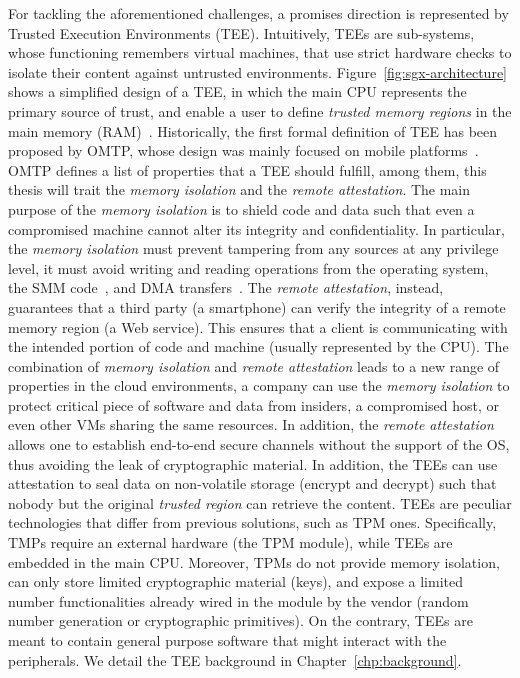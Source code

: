 For tackling the aforementioned challenges, a promises direction is 
represented by Trusted Execution Environments (TEE).
Intuitively, TEEs are sub-systems, whose functioning remembers virtual 
machines, that use strict hardware checks to isolate their content against 
untrusted environments.
Figure~\ref{fig:sgx-architecture} shows a simplified design of a TEE, in which 
the main CPU represents the primary source of 
trust, and enable a user to define \emph{trusted memory regions} in the main 
memory (RAM)~\citep{Sabt2015TrustedEE}.
Historically, the first formal definition of TEE has been proposed by OMTP, 
whose design was mainly focused on mobile platforms~\citep{omtp}.
OMTP defines a list of properties that a TEE should fulfill, among them, this 
thesis will trait the \emph{memory isolation} and the \emph{remote attestation}.
The main purpose of the \emph{memory isolation} is to shield code and data such 
that even a compromised machine cannot alter its integrity and confidentiality.
In particular, the \emph{memory isolation} must prevent tampering from any 
sources at any privilege level, \eg it must avoid writing and reading 
operations from the operating system, the SMM code~\citep{yao2009system}, and 
DMA transfers~\citep{coke1998implementing}.
The \emph{remote attestation}, instead, guarantees that a third party (\eg a 
smartphone) can verify the integrity of a remote memory region (\eg a 
Web service).
This ensures that a client is communicating with the intended portion of code 
and machine (usually represented by the CPU).
The combination of \emph{memory isolation} and \emph{remote attestation} leads 
to a new range of properties in the cloud environments, \ie a company 
can use the \emph{memory isolation} to protect critical piece of 
software and data from insiders, a compromised host, or even other VMs sharing 
the same resources.
In addition, the \emph{remote attestation} allows one to establish 
end-to-end secure channels without the support of the OS, thus avoiding the 
leak of cryptographic material.
In addition, the TEEs can use attestation to seal data on non-volatile storage 
(\ie encrypt and decrypt) such that nobody but the original \emph{trusted 
region} can retrieve the content. 
TEEs are peculiar technologies that differ from previous solutions, such as TPM 
ones. Specifically, TMPs require an external hardware (\ie the TPM module), 
while TEEs are embedded in the main CPU.
Moreover, TPMs do not provide memory isolation, can only store limited 
cryptographic material (\eg keys), and expose a limited number functionalities 
already wired in the module by the vendor
(\eg random number generation or cryptographic primitives).
On the contrary, TEEs are meant to contain general purpose software that might 
interact with the peripherals.
We detail the TEE background in Chapter~\ref{chp:background}.

